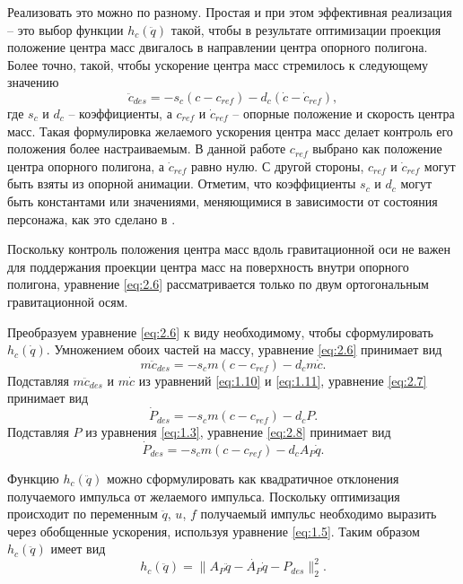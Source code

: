 Реализовать это можно по разному. Простая и при этом эффективная реализация -- это выбор функции $h_c(\ddot{q})$ такой, чтобы в результате оптимизации проекция положение центра масс двигалось в направлении центра опорного полигона. Более точно, такой, чтобы ускорение центра масс стремилось к следующему значению
\begin{equation*}
  \ddot{c}_{des} = - s_{c} (c - c_{ref}) - d_{c} (\dot{c} - \dot{c}_{ref}), \tag{2.6}\label{eq:2.6}
\end{equation*}
где $s_{c}$ и $d_{c}$ -- коэффициенты, а $c_{ref}$ и $\dot{c}_{ref}$ -- опорные положение и скорость центра масс. Такая формулировка желаемого ускорения центра масс делает контроль его положения более настраиваемым. В данной работе $c_{ref}$ выбрано как положение центра опорного полигона, а $\dot{c}_{ref}$ равно нулю. С другой стороны, $c_{ref}$ и $\dot{c}_{ref}$ могут быть взяты из опорной анимации. Отметим, что коэффициенты $s_{c}$ и $d_{c}$ могут быть константами или значениями, меняющимися в зависимости от состояния персонажа, как это сделано в \cite{AbeSP}.

Поскольку контроль положения центра масс вдоль гравитационной оси не важен для поддержания проекции центра масс на поверхность внутри опорного полигона, уравнение \ref{eq:2.6} рассматривается только по двум ортогональным гравитационной осям.

Преобразуем уравнение \ref{eq:2.6} к виду необходимому, чтобы сформулировать $h_c(\dot{q})$. Умножением обоих частей на массу, уравнение \ref{eq:2.6} принимает вид
\begin{equation*}
  m \ddot{c}_{des} = - s_{c} m (c - c_{ref}) - d_{c} m \dot{c}. \tag{2.7}\label{eq:2.7}
\end{equation*}
Подставляя $m \ddot{c}_{des}$ и $m \dot{c}$ из уравнений \ref{eq:1.10} и \ref{eq:1.11}, уравнение \ref{eq:2.7} принимает вид
\begin{equation*}
  \dot{P}_{des} = - s_{c} m (c - c_{ref}) - d_{c} P. \tag{2.8}\label{eq:2.8}
\end{equation*}
Подставляя $P$ из уравнения \ref{eq:1.3}, уравнение \ref{eq:2.8} принимает вид
\begin{equation*}
  \dot{P}_{des} = - s_{c} m (c - c_{ref}) - d_{c} A_{P} \dot{q}. \tag{2.9}\label{eq:2.9}
\end{equation*}

Функцию $h_c(\ddot{q})$ можно сформулировать как квадратичное отклонения получаемого импульса от желаемого импульса. Поскольку оптимизация происходит по переменным $\ddot{q}$, $u$, $f$ получаемый импульс необходимо выразить через обобщенные ускорения, используя уравнение \ref{eq:1.5}. Таким образом $h_c(\ddot{q})$ имеет вид
\begin{equation*}
  h_{c}(\ddot{q}) = \lVert A_{P}\ddot{q} - \dot{A_{P}} \dot{q} - P_{des} \rVert_{2}^{2}. \tag{2.10}\label{eq:2.10}
\end{equation*}

